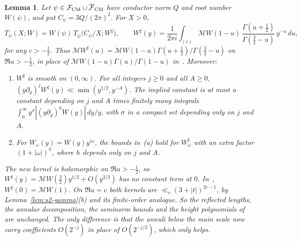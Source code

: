 \documentclass[11pt]{article}
\numberwithin{equation}{section}
\newtheorem{lemma}{Lemma}
\begin{document}
\begin{lemma}\label{lem:s2-reflection}
Let $\psi\in\mathcal F_{\rm CM}\cup\overline{\mathcal F}_{\rm CM}$ have conductor norm $Q$ and root number
$W(\psi)$, and put $C_\psi=3Q/(2\pi)^2$. For $X>0$,
\begin{equation}\label{eq:d160}
 T_\psi(X;W)=W(\psi)\,T_{\overline\psi}\bigl(C_\psi/X;W^\sharp\bigr),\qquad
 W^\sharp(y)=\frac1{2\pi i}\int_{(c)}\mathcal MW(1-u)\,\frac{\Gamma(u+\frac12)}{\Gamma(\frac32-u)}\,y^{-u}\,du ,
\end{equation}
for any $c>-\frac12$. Thus
$\mathcal MW^\sharp(u)=\mathcal MW(1-u)\Gamma(u+\frac12)/\Gamma(\frac32-u)$ on $\Re u>-\frac12$, in place of
$\mathcal MW(1-u)\Gamma(u)/\Gamma(1-u)$ in~\cite{OAI78}. Moreover:
\begin{enumerate}
\item[(a)] $W^\sharp$ is smooth on $(0,\infty)$. For all integers $j\ge0$ and all $A\ge0$,
 $(y\partial_y)^jW^\sharp(y)\ll\min(y^{1/2},y^{-A})$. The implied constant is at most a constant depending
 on $j$ and $A$ times finitely many integrals $\int_0^\infty y^{\sigma}|(y\partial_y)^kW(y)|\,dy/y$, with $\sigma$
 in a compact set depending only on $j$ and $A$.
\item[(b)] For $W_\omega(y)=W(y)y^{i\omega}$, the bounds in~(a) hold for $W_\omega^\sharp$ with an extra factor
 $(1+|\omega|)^{h}$, where $h$ depends only on $j$ and $A$.
\end{enumerate}
The new kernel is holomorphic on $\Re u>-\frac12$, so $W^\sharp(y)=\mathcal MW(\frac32)y^{1/2}+O(y^{3/2})$ has no
constant term at $0$. In~\cite{OAI78}, $W^\sharp(0)=\mathcal MW(1)$. On $\Re u=c$ both kernels are
$\ll_c(3+|t|)^{2c-1}$, by Lemma~\ref{lem:s2-gamma}(b) and its finite-order analogue. So the reflected lengths, the annular
decomposition, the seminorm bounds and the height polynomials of~\cite[Section~18.1]{OAI78} are unchanged.
The only difference is that the annuli below the main scale now carry coefficients $O(2^{-j})$ in place of
$O(2^{-j/2})$, which only helps.
\end{lemma}
\end{document}
